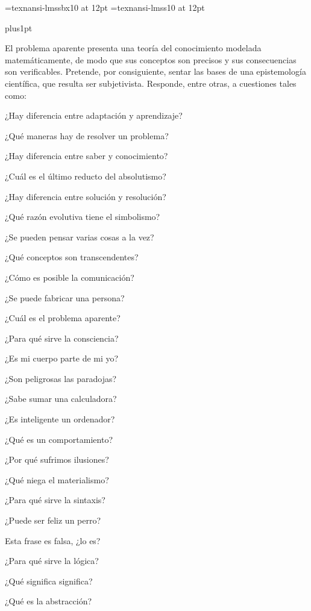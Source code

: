 \pdfWhite

\font\cpboldtextfont=texnansi-lmssbx10 at 12pt
\font\cptextfont=texnansi-lmss10 at 12pt

\cptextfont
\parindent=0pt
\parskip=0pt plus1pt
\baselineskip=13.3pt %

{\cpboldtextfont El problema aparente} 
presenta una teoría del conocimiento modelada matemáticamente,
de modo que sus conceptos son precisos y
sus consecuencias son verificables.
Pretende, por consiguiente,
sentar las bases de una epistemología científica,
que resulta ser subjetivista.
Responde, entre otras, a cuestiones tales como:
 \par
 ¿Hay diferencia entre adaptación y aprendizaje?\par
 ¿Qué maneras hay de resolver un problema?\par
 ¿Hay diferencia entre saber y conocimiento?\par
 ¿Cuál es el último reducto del absolutismo?\par
 ¿Hay diferencia entre solución y resolución?\par
 ¿Qué razón evolutiva tiene el simbolismo?\par
 ¿Se pueden pensar varias cosas a la vez?\par
 ¿Qué conceptos son transcendentes?\par
 ¿Cómo es posible la comunicación?\par
 ¿Se puede fabricar una persona?\par
 ¿Cuál es el problema aparente?\par
 ¿Para qué sirve la consciencia?\par
 ¿Es mi cuerpo parte de mi yo?\par
 ¿Son peligrosas las paradojas?\par
 ¿Sabe sumar una calculadora?\par
 ¿Es inteligente un ordenador?\par
 ¿Qué es un comportamiento?\par
 ¿Por qué sufrimos ilusiones?\par
 ¿Qué niega el materialismo?\par
 ¿Para qué sirve la sintaxis?\par
 ¿Puede ser feliz un perro?\par
 Esta frase es falsa, ¿lo es?\par
 ¿Para qué sirve la lógica?\par
 ¿Qué significa significa?\par
 ¿Qué es la abstracción?\par
